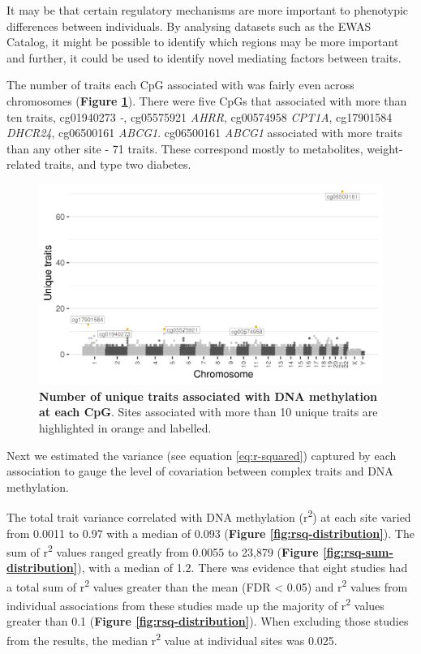 \documentclass[11pt,oneside]{bristolthesis}
\begin{document}
It may be that certain regulatory mechanisms are more important to phenotypic differences between individuals. By analysing datasets such as the EWAS Catalog, it might be possible to identify which regions may be more important and further, it could be used to identify novel mediating factors between traits.

The number of traits each CpG associated with was fairly even across chromosomes (\textbf{Figure \ref{fig:traits-manhattan}}). There were five CpGs that associated with more than ten traits, cg01940273 \emph{-}, cg05575921 \emph{AHRR}, cg00574958 \emph{CPT1A}, cg17901584 \emph{DHCR24}, cg06500161 \emph{ABCG1}. cg06500161 \emph{ABCG1} associated with more traits than any other site - 71 traits. These correspond mostly to metabolites, weight-related traits, and type two diabetes.




\begin{figure}

{\centering \includegraphics[width=1\linewidth]{figure/04-properties_of_ewas/traits_per_dmp_at_1e-07} 

}

\caption[Number of unique traits associated with DNA methylation at each CpG]{\textbf{Number of unique traits associated with DNA methylation at each CpG}. Sites associated with more than 10 unique traits are highlighted in orange and labelled.}\label{fig:traits-manhattan}
\end{figure}
Next we estimated the variance (see equation \eqref{eq:r-squared}) captured by each association to gauge the level of covariation between complex traits and DNA methylation.

The total trait variance correlated with DNA methylation (r\textsuperscript{2}) at each site varied from 0.0011 to 0.97 with a median of 0.093 (\textbf{Figure \ref{fig:rsq-distribution}}). The sum of r\textsuperscript{2} values ranged greatly from 0.0055 to 23,879 (\textbf{Figure \ref{fig:rsq-sum-distribution}}), with a median of 1.2. There was evidence that eight studies had a total sum of r\textsuperscript{2} values greater than the mean (FDR \textless{} 0.05) and r\textsuperscript{2} values from individual associations from these studies made up the majority of r\textsuperscript{2} values greater than 0.1 (\textbf{Figure \ref{fig:rsq-distribution}}). When excluding those studies from the results, the median r\textsuperscript{2} value at individual sites was 0.025.
\end{document}
